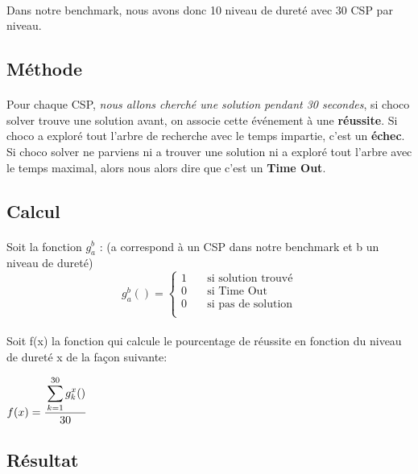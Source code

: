 \documentclass[a4paper]{article}
\begin{document}
  \paragraph{}
    Dans notre benchmark, nous avons donc 10 niveau de dureté avec 30 CSP par niveau.
  \subsection{Méthode}
  \paragraph{}
    Pour chaque CSP, \emph{nous allons cherché une solution pendant 30 secondes}, si choco solver trouve une solution avant, on associe cette événement à une \textbf{réussite}. Si choco a exploré tout l'arbre de recherche avec le temps impartie, c'est un \textbf{échec}. Si choco solver ne parviens ni a trouver une solution ni a exploré tout l'arbre avec le temps maximal, alors nous alors dire que c'est un \textbf{Time Out}.
  \subsection{Calcul}
  \paragraph{}
    Soit la fonction $g_a^b$ : (a correspond à un CSP dans notre benchmark et b un niveau de dureté)\\
    \[ g_a^b() =
      \begin{cases}
        1       & \quad \text{si solution trouvé}\\
        0       & \quad \text{si Time Out}\\
        0       & \quad \text{si pas de solution}\\
      \end{cases}
    \]
  \paragraph{}
    Soit f(x) la fonction qui calcule le pourcentage de réussite en fonction du niveau de dureté x de la façon suivante:\\
    \begin{center}
      $f(x)=\cfrac{\displaystyle\sum_{k=1}^{30} g_k^x()}{30}$
    \end{center}
  \newpage
  \subsection{Résultat}
\end{document}
